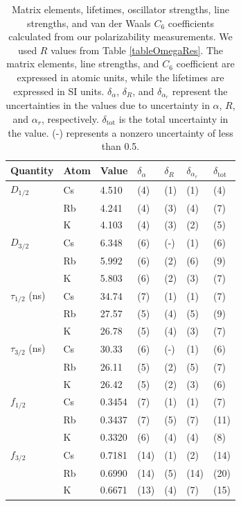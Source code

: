 \documentclass[twocolumn,pra,showpacs,superscriptaddress,longbibliography]{revtex4-1}   %
\begin{document}
\begingroup
\begin{table}
\caption{\label{tableMisc}Matrix elements, lifetimes, oscillator strengths, line strengths, and van der Waals $C_6$ coefficients calculated from our polarizability measurements.
We used $R$ values from Table \ref{tableOmegaRes}. The matrix elements, line strengths, and $C_6$ coefficient are expressed in atomic units, while the lifetimes are expressed in SI units.
$\delta_{\alpha}$, $\delta_{R}$, and $\delta_{\alpha_r}$ represent the uncertainties in the values due to uncertainty in $\alpha$, $R$, and $\alpha_r$, respectively. $\delta_{\mathrm{tot}}$ is the total uncertainty in the value. (-) represents a nonzero uncertainty of less than 0.5.}
\begin{center}
\begin{tabular}{lllllll}
\hline\hline
Quantity & Atom & Value & $\delta_{\alpha}$ & $\delta_{R}$ & $\delta_{\alpha_r}$ & $\delta_{\mathrm{tot}}$ \\
\hline
$D_{1/2}$ 		& Cs & 4.510 & (4) & (1) & (1) & (4) \\
 					& Rb & 4.241 & (4) & (3) & (4) & (7) \\
 					& K  & 4.103 & (4) & (3) & (2) & (5) \\ \hline
$D_{3/2}$ 		& Cs & 6.348 & (6) & (-) & (1) & (6) \\
 					& Rb & 5.992 & (6) & (2) & (6) & (9) \\
 					& K  & 5.803 & (6) & (2) & (3) & (7) \\ \hline
$\tau_{1/2}$ (ns) 	& Cs & 34.74 & (7) & (1) & (1) & (7) \\
 					& Rb & 27.57 & (5) & (4) & (5) & (9) \\
 					& K  & 26.78 & (5) & (4) & (3) & (7) \\ \hline
$\tau_{3/2}$ (ns) 	& Cs & 30.33 & (6) & (-) & (1) & (6) \\
 					& Rb & 26.11 & (5) & (2) & (5) & (7) \\
 					& K  & 26.42 & (5) & (2) & (3) & (6) \\ \hline
$f_{1/2}$ 			& Cs & 0.3454 & (7) & (1) & (1) & (7) \\
 					& Rb & 0.3437 & (7) & (5) & (7) & (11) \\
 					& K  & 0.3320 & (6) & (4) & (4) & (8) \\ \hline
$f_{3/2}$ 			& Cs & 0.7181 & (14) & (1) & (2) & (14) \\
 					& Rb & 0.6990 & (14) & (5) & (14) & (20) \\
 					& K  & 0.6671 & (13) & (4) & (7) & (15) \\ \hline

\end{tabular}
\end{center}
\end{table}
\end{document}
